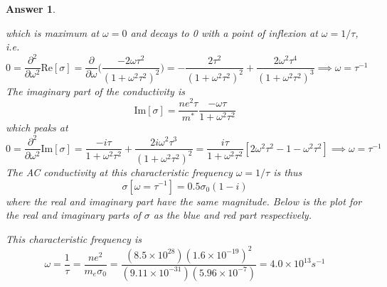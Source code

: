 \documentclass[a4paper]{article}
\newtheorem{ans}{Answer}[subsection]
\theoremstyle{new}
\begin{document}
\begin{ans}
\begin{enumerate}[label=(\roman*)]
which is maximum at $\omega=0$ and decays to 0 with a point of inflexion at $\omega=1/\tau$, i.e.
$$0=\frac{\partial^2}{\partial\omega^2}\text{Re}[\sigma]=\frac{\partial}{\partial\omega}\bigg(\frac{-2\omega\tau^2}{(1+\omega^2\tau^2)^2}\bigg)=-\frac{2\tau^2}{(1+\omega^2\tau^2)^2}+\frac{2\omega^2\tau^4}{(1+\omega^2\tau^2)^3}\implies\omega=\tau^{-1}$$
The imaginary part of the conductivity is
$$\text{Im}[\sigma]=\frac{ne^2\tau}{m^*}\frac{-\omega\tau}{1+\omega^2\tau^2}$$
which peaks at
$$0=\frac{\partial^2}{\partial\omega^2}\text{Im}[\sigma]=\frac{-i\tau}{1+\omega^2\tau^2}+\frac{2i\omega^2\tau^3}{(1+\omega^2\tau^2)^2}=\frac{i\tau}{1+\omega^2\tau^2}[2\omega^2\tau^2-1-\omega^2\tau^2]\implies\omega=\tau^{-1}$$
The AC conductivity at this characteristic frequency $\omega=1/\tau$ is thus
$$\sigma[\omega=\tau^{-1}]=0.5\sigma_0(1-i)$$
where the real and imaginary part have the same magnitude. Below is the plot for the real and imaginary parts of $\sigma$ as the blue and red part respectively.
\begin{center}
\end{center}
This characteristic frequency is
$$\omega=\frac{1}{\tau}=\frac{ne^2}{m_e\sigma_0}=\frac{(8.5\times10^{28})(1.6\times10^{-19})^2}{(9.11\times10^{-31})(5.96\times10^{-7})}=4.0\times10^{13}s^{-1}$$
\end{enumerate}
\end{ans}
\newpage
\end{document}
